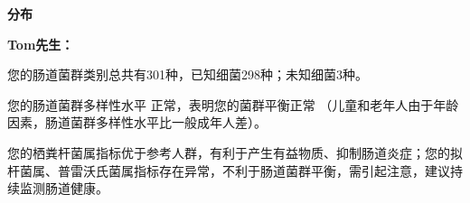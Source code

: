 

\usepackage{graphicx}
\graphicspath{{cores/}}



\setlength{\arrayrulewidth}{0.5pt}
\fontsize{9.3pt}{17pt}\selectfont
\color{gray2}

\vspace*{2mm}
\begin{center}
{\bf\sanhao 分布}
\end{center}

\medskip

\noindent
{\bf\xiaosihao Tom先生：}


\bigskip

您的肠道菌群类别总共有301种，已知细菌298种；未知细菌3种。

您的肠道菌群多样性水平
正常，表明您的菌群平衡正常
（儿童和老年人由于年龄因素，肠道菌群多样性水平比一般成年人差）。

您的栖粪杆菌属指标优于参考人群，有利于产生有益物质、抑制肠道炎症；您的拟杆菌属、普雷沃氏菌属指标存在异常，不利于肠道菌群平衡，需引起注意，建议持续监测肠道健康。

